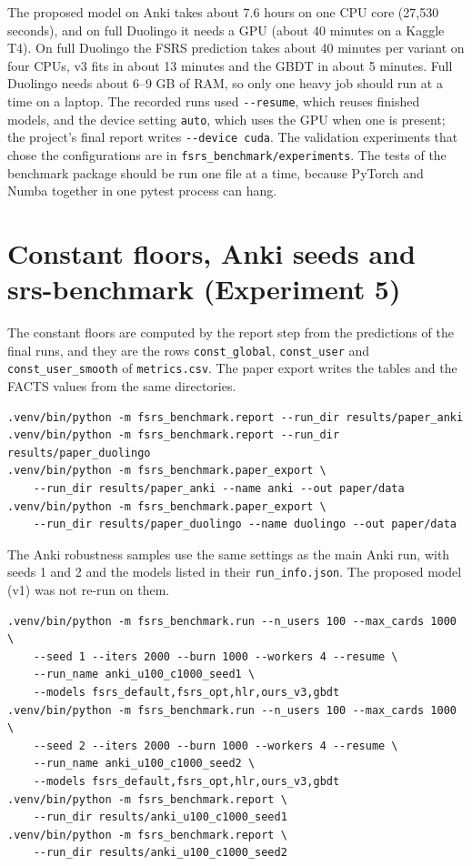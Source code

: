 The proposed model on Anki takes about 7.6 hours on one CPU core (27,530 seconds), and on full Duolingo it needs a GPU (about 40 minutes on a Kaggle T4). On full
Duolingo the FSRS prediction takes about 40 minutes per variant on four CPUs, v3 fits in about 13 minutes and the GBDT in about 5 minutes. Full Duolingo needs about 6--9 GB of RAM, so only one heavy
job should run at a time on a laptop. The recorded runs used \texttt{-{}-resume}, which reuses finished models, and the device setting \texttt{auto}, which uses the GPU when one is present; the project's final report writes \texttt{-{}-device cuda}. The validation experiments that chose the configurations are in
\texttt{fsrs\_benchmark/experiments}. The tests of the benchmark package should be run one file at a time, because PyTorch and Numba together in one pytest process can hang.

\section{Constant floors, Anki seeds and srs-benchmark (Experiment 5)}

The constant floors are computed by the report step from the predictions of the final runs, and they are the rows \texttt{const\_global}, \texttt{const\_user} and \texttt{const\_user\_smooth} of \texttt{metrics.csv}. The paper export writes the tables and the FACTS values from the same directories.

\begingroup\footnotesize\begin{verbatim}
.venv/bin/python -m fsrs_benchmark.report --run_dir results/paper_anki
.venv/bin/python -m fsrs_benchmark.report --run_dir results/paper_duolingo
.venv/bin/python -m fsrs_benchmark.paper_export \
    --run_dir results/paper_anki --name anki --out paper/data
.venv/bin/python -m fsrs_benchmark.paper_export \
    --run_dir results/paper_duolingo --name duolingo --out paper/data
\end{verbatim}
\endgroup

The Anki robustness samples use the same settings as the main Anki run, with seeds 1 and 2 and the models listed in their \texttt{run\_info.json}. The proposed model (v1) was not re-run on them.

\begingroup\footnotesize\begin{verbatim}
.venv/bin/python -m fsrs_benchmark.run --n_users 100 --max_cards 1000 \
    --seed 1 --iters 2000 --burn 1000 --workers 4 --resume \
    --run_name anki_u100_c1000_seed1 \
    --models fsrs_default,fsrs_opt,hlr,ours_v3,gbdt
.venv/bin/python -m fsrs_benchmark.run --n_users 100 --max_cards 1000 \
    --seed 2 --iters 2000 --burn 1000 --workers 4 --resume \
    --run_name anki_u100_c1000_seed2 \
    --models fsrs_default,fsrs_opt,hlr,ours_v3,gbdt
.venv/bin/python -m fsrs_benchmark.report \
    --run_dir results/anki_u100_c1000_seed1
.venv/bin/python -m fsrs_benchmark.report \
    --run_dir results/anki_u100_c1000_seed2
\end{verbatim}
\endgroup

